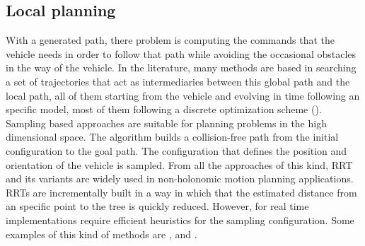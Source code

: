 \subsection{Local planning}\label{ch:chapter00_02_03}

With a generated path, there problem is computing the commands that the vehicle needs in order to follow that path while avoiding the occasional obstacles in the way of the vehicle. In the literature, many methods are based in searching a set of trajectories that act as intermediaries between this global path and the local path, all of them starting from the vehicle and evolving in time following an specific model, most of them following a discrete optimization scheme (\cite{thrun2006stanley, montemerlo2008junior, werling2010optimal, ferguson2008motion}).
Sampling based approaches are suitable for planning problems in the high dimensional space. The algorithm builds a collision-free path from the initial configuration to the goal path. The configuration that defines the position and orientation of the vehicle is sampled. From all the approaches of this kind, \ac{RRT} and its variants are widely used in non-holonomic motion planning applications.
\acp{RRT} are incrementally built in a way in which that the estimated distance from an specific point to the tree is quickly reduced. However, for real time implementations require efficient heuristics for the sampling configuration. 
Some examples of this kind of methods are \cite{van1997real}, \cite{lavalle2001randomized} and \cite{kuwata2009real}.

